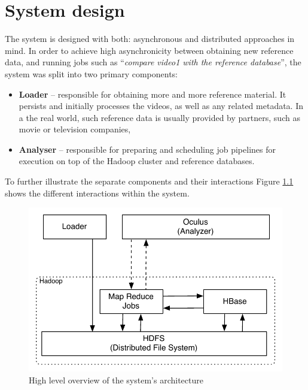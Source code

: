 
\chapter{System design}
\label{chap:system-design}

The system is designed with both: asynchronous and distributed approaches in mind. In order to achieve high asynchronicity between obtaining new reference data, and running jobs such as ``\textit{compare video1 with the reference database}'', the system was split into two primary components:

\begin{itemize}
  \item \textbf{Loader} -- responsible for obtaining more and more reference material. It persists and initially processes the videos, as well as any related metadata. In a the real world, such reference data is usually provided by partners, such as movie or television companies,
  \item \textbf{Analyser} -- responsible for preparing and scheduling job pipelines for execution on top of the Hadoop cluster and reference databases.
\end{itemize}

To further illustrate the separate components and their interactions Figure \ref{fig:system-overview} shows the different interactions within the system.

\begin{figure}[hc!]
 \centering
  \includegraphics[scale=0.9]{./diagrams/high-level-system.pdf}
  \caption{High level overview of the system's architecture}
  \label{fig:system-overview}
\end{figure}

